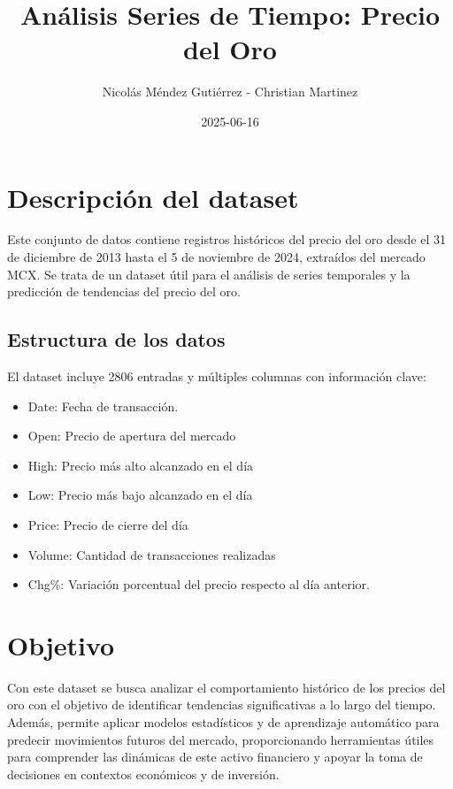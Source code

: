 \documentclass[
]{book}
\title{Análisis Series de Tiempo: Precio del Oro}
\author{Nicolás Méndez Gutiérrez - Christian Martinez}
\date{2025-06-16}
\providecommand{\tightlist}{%
  \setlength{\itemsep}{0pt}\setlength{\parskip}{0pt}}
\begin{document}
\maketitle

{
\setcounter{tocdepth}{1}
\tableofcontents
}
\chapter{Descripción del dataset}\label{descripciuxf3n-del-dataset}

Este conjunto de datos contiene registros históricos del precio del oro desde el 31 de diciembre de 2013 hasta el 5 de noviembre de 2024, extraídos del mercado MCX. Se trata de un dataset útil para el análisis de series temporales y la predicción de tendencias del precio del oro.

\section{Estructura de los datos}\label{estructura-de-los-datos}

El dataset incluye 2806 entradas y múltiples columnas con información clave:

\begin{itemize}
\tightlist
\item
  Date: Fecha de transacción.
\item
  Open: Precio de apertura del mercado
\item
  High: Precio más alto alcanzado en el día
\item
  Low: Precio más bajo alcanzado en el día
\item
  Price: Precio de cierre del día
\item
  Volume: Cantidad de transacciones realizadas
\item
  Chg\%: Variación porcentual del precio respecto al día anterior.
\end{itemize}

\chapter{Objetivo}\label{objetivo}

Con este dataset se busca analizar el comportamiento histórico de los precios del oro con el objetivo de identificar tendencias significativas a lo largo del tiempo. Además, permite aplicar modelos estadísticos y de aprendizaje automático para predecir movimientos futuros del mercado, proporcionando herramientas útiles para comprender las dinámicas de este activo financiero y apoyar la toma de decisiones en contextos económicos y de inversión.
\end{document}
